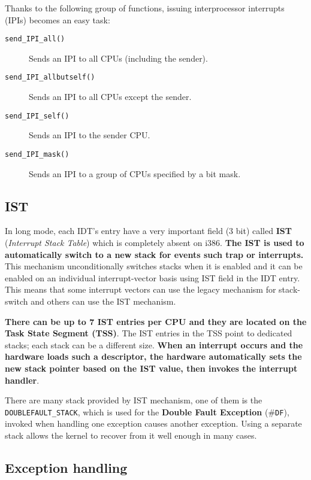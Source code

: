 \documentclass[10pt,a4paper]{article}
\begin{document}
Thanks to the following group of functions, issuing interprocessor interrupts (IPIs) becomes an easy task:

\begin{description}
\item[\texttt{send\_IPI\_all()}] Sends an IPI to all CPUs (including the sender).
\item[\texttt{send\_IPI\_allbutself()}] Sends an IPI to all CPUs except the sender.
\item[\texttt{send\_IPI\_self()}] Sends an IPI to the sender CPU.
\item[\texttt{send\_IPI\_mask()}] Sends an IPI to a group of CPUs specified by a bit mask.
\end{description}


\subsection{IST}

In long mode, each IDT's entry have a very important field (3 bit) called \textbf{IST} (\textit{Interrupt Stack Table}) which is completely absent on i386. \textbf{The IST is used to automatically switch to a new stack for events such trap or interrupts.} This mechanism unconditionally switches stacks when it is enabled and it can be enabled on an individual interrupt-vector basis using IST field in the IDT entry. This means that some interrupt vectors can use the legacy mechanism for stack-switch and others can use the IST mechanism.

\textbf{There can be up to 7 IST entries per CPU and they are located on the Task State Segment (TSS)}. The IST entries in the TSS point to dedicated stacks; each stack can be a different size. \textbf{When an interrupt occurs and the hardware loads such a descriptor, the hardware automatically sets the new stack pointer based on the IST value, then invokes the interrupt handler}.  

There are many stack provided by IST mechanism, one of them is the \texttt{DOUBLEFAULT\_STACK}, which is used for the \textbf{Double Fault Exception} (\#\texttt{DF}), invoked when handling one exception causes another exception. Using a separate stack allows the kernel to recover from it well enough in many cases.

\subsection{Exception handling}
\end{document}
